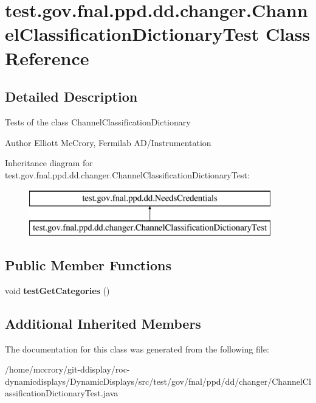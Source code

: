 \hypertarget{classtest_1_1gov_1_1fnal_1_1ppd_1_1dd_1_1changer_1_1ChannelClassificationDictionaryTest}{\section{test.\-gov.\-fnal.\-ppd.\-dd.\-changer.\-Channel\-Classification\-Dictionary\-Test Class Reference}
\label{classtest_1_1gov_1_1fnal_1_1ppd_1_1dd_1_1changer_1_1ChannelClassificationDictionaryTest}
}


\subsection{Detailed Description}
Tests of the class Channel\-Classification\-Dictionary

\begin{DoxyAuthor}{Author}
Elliott Mc\-Crory, Fermilab A\-D/\-Instrumentation 
\end{DoxyAuthor}
Inheritance diagram for test.\-gov.\-fnal.\-ppd.\-dd.\-changer.\-Channel\-Classification\-Dictionary\-Test\-:\begin{figure}[H]
\begin{center}
\leavevmode
\includegraphics[height=2.000000cm]{classtest_1_1gov_1_1fnal_1_1ppd_1_1dd_1_1changer_1_1ChannelClassificationDictionaryTest}
\end{center}
\end{figure}
\subsection*{Public Member Functions}
\begin{DoxyCompactItemize}
\item 
\hypertarget{classtest_1_1gov_1_1fnal_1_1ppd_1_1dd_1_1changer_1_1ChannelClassificationDictionaryTest_a2c3396f83d17d27a31eefad2160e8686}{void {\bfseries test\-Get\-Categories} ()}\label{classtest_1_1gov_1_1fnal_1_1ppd_1_1dd_1_1changer_1_1ChannelClassificationDictionaryTest_a2c3396f83d17d27a31eefad2160e8686}

\end{DoxyCompactItemize}
\subsection*{Additional Inherited Members}


The documentation for this class was generated from the following file\-:\begin{DoxyCompactItemize}
\item 
/home/mccrory/git-\/ddisplay/roc-\/dynamicdisplays/\-Dynamic\-Displays/src/test/gov/fnal/ppd/dd/changer/Channel\-Classification\-Dictionary\-Test.\-java\end{DoxyCompactItemize}
